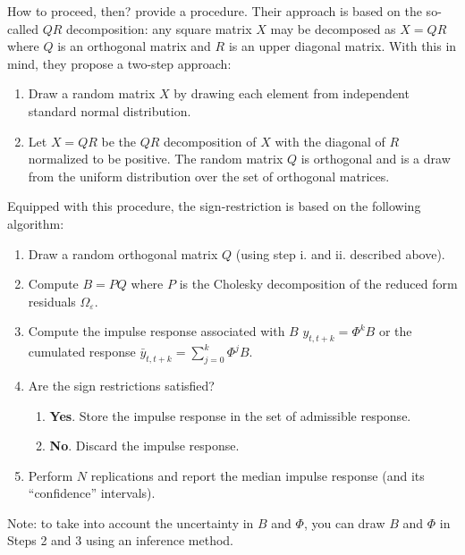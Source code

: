 \documentclass[
]{book}
\providecommand{\tightlist}{%
  \setlength{\itemsep}{0pt}\setlength{\parskip}{0pt}}
\theoremstyle{definition}
\theoremstyle{definition}
\theoremstyle{definition}
\theoremstyle{definition}
\theoremstyle{remark}
\begin{document}
How to proceed, then? \citet{Arias_et_al_2018} provide a procedure. Their approach is based on the so-called \(QR\) decomposition: any square matrix \(X\) may be decomposed as \(X=QR\) where \(Q\) is an orthogonal matrix and \(R\) is an upper diagonal matrix. With this in mind, they propose a two-step approach:

\begin{enumerate}
\def\labelenumi{\roman{enumi}.}
\tightlist
\item
  Draw a random matrix \(X\) by drawing each element from independent standard normal distribution.
\item
  Let \(X = QR\) be the \(QR\) decomposition of \(X\) with the diagonal of \(R\) normalized to be
  positive. The random matrix \(Q\) is orthogonal and is a draw from the uniform distribution over the set of orthogonal matrices.
\end{enumerate}

Equipped with this procedure, the sign-restriction is based on the following algorithm:

\begin{enumerate}
\def\labelenumi{\arabic{enumi}.}
\tightlist
\item
  Draw a random orthogonal matrix \(Q\) (using step i. and ii. described above).
\item
  Compute \(B = PQ\) where \(P\) is the Cholesky decomposition of the reduced form residuals \(\Omega_{\varepsilon}\).
\item
  Compute the impulse response associated with \(B\) \(y_{t,t+k}=\Phi^kB\) or the cumulated response \(\bar y_{t,t+k}=\sum_{j=0}^{k}\Phi^jB\).
\item
  Are the sign restrictions satisfied?

  \begin{enumerate}
  \def\labelenumii{\alph{enumii}.}
  \tightlist
  \item
    \textbf{Yes}. Store the impulse response in the set of admissible response.
  \item
    \textbf{No}. Discard the impulse response.
  \end{enumerate}
\item
  Perform \(N\) replications and report the median impulse response (and its ``confidence'' intervals).
\end{enumerate}

Note: to take into account the uncertainty in \(B\) and \(\Phi\), you can draw \(B\) and \(\Phi\) in Steps 2 and 3 using an inference method.
\end{document}
